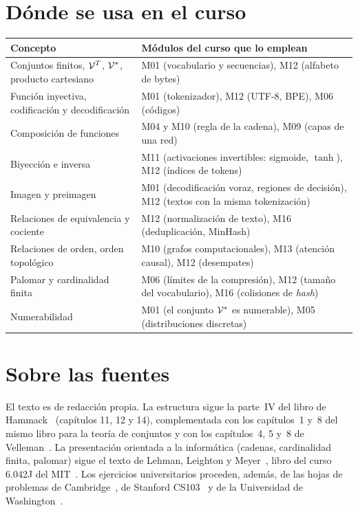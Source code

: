 \documentclass[11pt,a4paper,twoside,openany]{book}
\begin{document}
\section*{Dónde se usa en el curso}
\begin{center}\small
\begin{tabular}{@{}p{}p{}@{}}
\toprule
Concepto & Módulos del curso que lo emplean \\
\midrule
Conjuntos finitos, $\mathcal{V}^{T}$, $\mathcal{V}^{*}$, producto cartesiano & M01 (vocabulario y secuencias), M12 (alfabeto de bytes) \\
Función inyectiva, codificación y decodificación & M01 (tokenizador), M12 (UTF-8, BPE), M06 (códigos) \\
Composición de funciones & M04 y M10 (regla de la cadena), M09 (capas de una red) \\
Biyección e inversa & M11 (activaciones invertibles: sigmoide, $\tanh$), M12 (índices de tokens) \\
Imagen y preimagen & M01 (decodificación voraz, regiones de decisión), M12 (textos con la misma tokenización) \\
Relaciones de equivalencia y cociente & M12 (normalización de texto), M16 (deduplicación, MinHash) \\
Relaciones de orden, orden topológico & M10 (grafos computacionales), M13 (atención causal), M12 (desempates) \\
Palomar y cardinalidad finita & M06 (límites de la compresión), M12 (tamaño del vocabulario), M16 (colisiones de \emph{hash}) \\
Numerabilidad & M01 (el conjunto $\mathcal{V}^{*}$ es numerable), M05 (distribuciones discretas) \\
\bottomrule
\end{tabular}
\end{center}

\section*{Sobre las fuentes}
El texto es de redacción propia. La estructura sigue la parte~IV del libro de Hammack~\cite{hammack} (capítulos 11, 12 y 14), complementada con los capítulos~1 y~8 del mismo libro para la teoría de conjuntos y con los capítulos~4, 5 y~8 de Velleman~\cite{velleman}. La presentación orientada a la informática (cadenas, cardinalidad finita, palomar) sigue el texto de Lehman, Leighton y Meyer~\cite{mcs}, libro del curso 6.042J del MIT~\cite{mit6042}. Los ejercicios universitarios proceden, además, de las hojas de problemas de Cambridge~\cite{camns,camdm}, de Stanford CS103~\cite{cs103set,cs103ps3,cs103card} y de la Universidad de Washington~\cite{uw300}.
\end{document}
